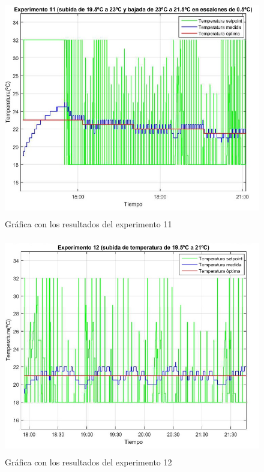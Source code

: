 \begin{figure}[H]
\centering
\includegraphics[width=130mm,height=95mm]{imagenes/anexo2/experimento11}
\caption {Gráfica con los resultados del experimento 11}
\label{figA2_7:experimento11}
\end{figure}

\begin{figure}[H]
\centering
\includegraphics[width=130mm,height=95mm]{imagenes/anexo2/experimento12}
\caption {Gráfica con los resultados del experimento 12}
\label{figA2_8:experimento12}
\end{figure}
